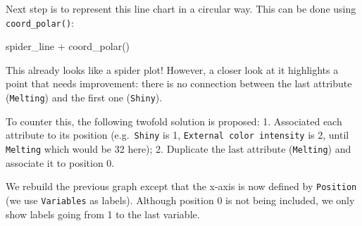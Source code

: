 \documentclass[
]{book}
\newenvironment{Shaded}{\begin{snugshade}}{\end{snugshade}}
\newcommand{\AttributeTok}[1]{\textcolor[rgb]{0.77,0.63,0.00}{#1}}
\newcommand{\DecValTok}[1]{\textcolor[rgb]{0.00,0.00,0.81}{#1}}
\newcommand{\FunctionTok}[1]{\textcolor[rgb]{0.00,0.00,0.00}{#1}}
\newcommand{\NormalTok}[1]{#1}
\newcommand{\OtherTok}[1]{\textcolor[rgb]{0.56,0.35,0.01}{#1}}
\newcommand{\SpecialCharTok}[1]{\textcolor[rgb]{0.00,0.00,0.00}{#1}}
\newcommand{\StringTok}[1]{\textcolor[rgb]{0.31,0.60,0.02}{#1}}
\begin{document}
Next step is to represent this line chart in a circular way. This can be done using \texttt{coord\_polar()}:

\begin{Shaded}
\begin{Highlighting}[]
\NormalTok{spider\_line }\SpecialCharTok{+} \FunctionTok{coord\_polar}\NormalTok{()}
\end{Highlighting}
\end{Shaded}

This already looks like a spider plot! However, a closer look at it highlights a point that needs improvement: there is no connection between the last attribute (\texttt{Melting}) and the first one (\texttt{Shiny}).

To counter this, the following twofold solution is proposed:
1. Associated each attribute to its position (e.g.~\texttt{Shiny} is 1, \texttt{External\ color\ intensity} is 2, until \texttt{Melting} which would be 32 here);
2. Duplicate the last attribute (\texttt{Melting}) and associate it to position 0.

\begin{Shaded}
\end{Shaded}

We rebuild the previous graph except that the x-axis is now defined by \texttt{Position} (we use \texttt{Variables} as labels). Although position 0 is not being included, we only show labels going from 1 to the last variable.
\end{document}

